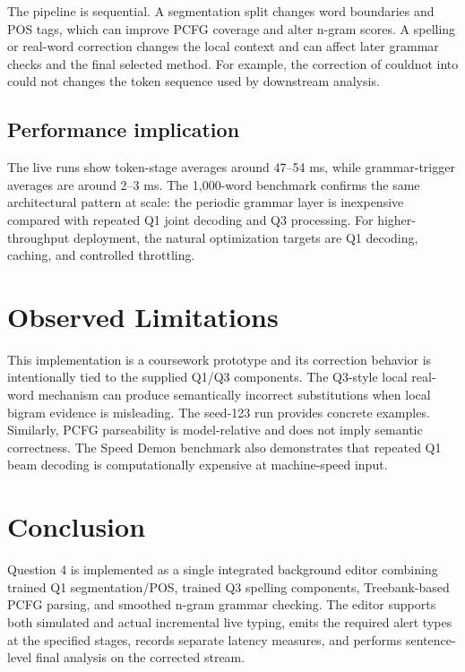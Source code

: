 \documentclass[11pt]{article}
\begin{document}
The pipeline is sequential. A segmentation split changes word boundaries and POS tags, which can improve PCFG coverage and alter n-gram scores. A spelling or real-word correction changes the local context and can affect later grammar checks and the final selected method. For example, the correction of couldnot into could not changes the token sequence used by downstream analysis.

\subsection{Performance implication}

The live runs show token-stage averages around 47--54 ms, while grammar-trigger averages are around 2--3 ms. The 1,000-word benchmark confirms the same architectural pattern at scale: the periodic grammar layer is inexpensive compared with repeated Q1 joint decoding and Q3 processing. For higher-throughput deployment, the natural optimization targets are Q1 decoding, caching, and controlled throttling.

\section{Observed Limitations}

This implementation is a coursework prototype and its correction behavior is intentionally tied to the supplied Q1/Q3 components. The Q3-style local real-word mechanism can produce semantically incorrect substitutions when local bigram evidence is misleading. The seed-123 run provides concrete examples. Similarly, PCFG parseability is model-relative and does not imply semantic correctness. The Speed Demon benchmark also demonstrates that repeated Q1 beam decoding is computationally expensive at machine-speed input.

\section{Conclusion}

Question 4 is implemented as a single integrated background editor combining trained Q1 segmentation/POS, trained Q3 spelling components, Treebank-based PCFG parsing, and smoothed n-gram grammar checking. The editor supports both simulated and actual incremental live typing, emits the required alert types at the specified stages, records separate latency measures, and performs sentence-level final analysis on the corrected stream.
\end{document}
